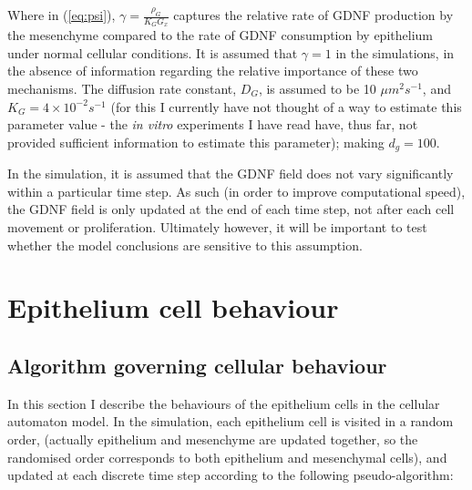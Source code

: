 \documentclass[pdftex,10pt,a4paper]{article}
\begin{document}
Where in (\ref{eq:psi}), $\gamma = \frac{\rho_G}{K_G G_x}$ captures the relative rate of GDNF production by the mesenchyme compared to the rate of GDNF consumption by epithelium under normal cellular conditions. It is assumed that $\gamma = 1$ in the simulations, in the absence of information regarding the relative importance of these two mechanisms. The diffusion rate constant, $D_G$, is assumed to be 10 $\mu m^2 s^{-1}$, and $K_G = 4 \times 10^{-2} s^{-1}$ (for this I currently have not thought of a way to estimate this parameter value - the \textit{in vitro} experiments I have read have, thus far, not provided sufficient information to estimate this parameter); making $d_g = 100$. 

In the simulation, it is assumed that the GDNF field does not vary significantly within a particular time step. As such (in order to improve computational speed), the GDNF field is only updated at the end of each time step, not after each cell movement or proliferation. Ultimately however, it will be important to test whether the model conclusions are sensitive to this assumption.

\section{Epithelium cell behaviour}
\subsection{Algorithm governing cellular behaviour}
In this section I describe the behaviours of the epithelium cells in the cellular automaton model. In the simulation, each epithelium cell is visited in a random order, (actually epithelium and mesenchyme are updated together, so the randomised order corresponds to both epithelium and mesenchymal cells), and updated at each discrete time step according to the following pseudo-algorithm:
\end{document}
